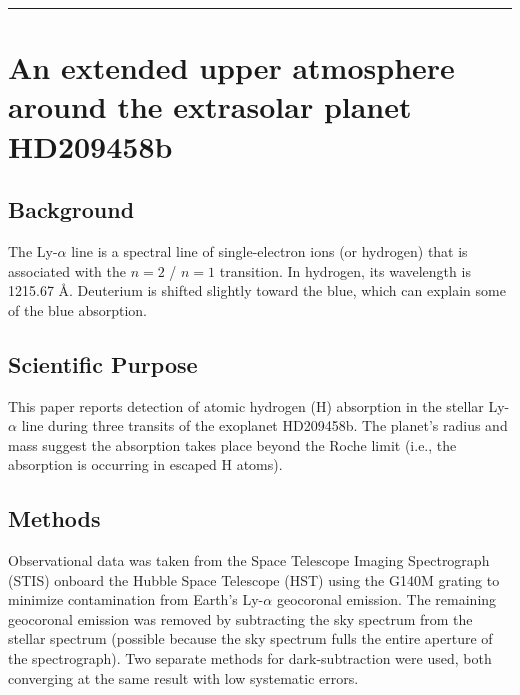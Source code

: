 \documentclass[onecolumn]{aastex63}
\begin{document}

\vspace{1cm}
\hrule
\vspace{1cm}

\section{An extended upper atmosphere around the extrasolar planet HD209458b}
\begin{centering}

\cite{vidal-madjar2003}

\end{centering}


\subsection{Background}

The Ly-$\alpha$ line is a spectral line of single-electron ions (or hydrogen) that is associated with the $n=2$ / $n=1$ transition. In hydrogen, its wavelength is 1215.67 \r{A}. Deuterium is shifted slightly toward the blue, which can explain some of the blue absorption.

\subsection{Scientific Purpose}
This paper reports detection of atomic hydrogen (H) absorption in the stellar Ly-$\alpha$ line during three transits of the exoplanet HD209458b. The planet's radius and mass suggest the absorption takes place beyond the Roche limit (i.e., the absorption is occurring in escaped H atoms).

\subsection{Methods}
Observational data was taken from the Space Telescope Imaging Spectrograph (STIS) onboard the Hubble Space Telescope (HST) using the G140M grating to minimize contamination from Earth's Ly-$\alpha$ geocoronal emission. The remaining geocoronal emission was removed by subtracting the sky spectrum from the stellar spectrum (possible because the sky spectrum fulls the entire aperture of the spectrograph). Two separate methods for dark-subtraction were used, both converging at the same result with low systematic errors. 
\end{document}

